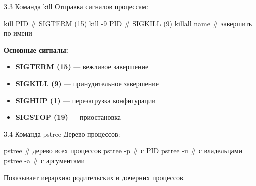 \documentclass[
  ignorenonframetext,
  aspectratio=169,
  russian,
]{beamer}
\newenvironment{Shaded}{\begin{snugshade}}{\end{snugshade}}
\newcommand{\AttributeTok}[1]{\textcolor[rgb]{0.40,0.45,0.13}{#1}}
\newcommand{\BuiltInTok}[1]{\textcolor[rgb]{0.00,0.23,0.31}{#1}}
\newcommand{\CommentTok}[1]{\textcolor[rgb]{0.37,0.37,0.37}{#1}}
\newcommand{\FunctionTok}[1]{\textcolor[rgb]{0.28,0.35,0.67}{#1}}
\newcommand{\NormalTok}[1]{\textcolor[rgb]{0.00,0.23,0.31}{#1}}
\providecommand{\tightlist}{%
  \setlength{\itemsep}{0pt}\setlength{\parskip}{0pt}}
\begin{document}
\begin{frame}[fragile]{3.3 Команда kill}
\label{ux43aux43eux43cux430ux43dux434ux430-kill}
Отправка сигналов процессам:

\begin{Shaded}
\begin{Highlighting}[]
\BuiltInTok{kill}\NormalTok{ PID        }\CommentTok{\# SIGTERM (15)}
\BuiltInTok{kill} \AttributeTok{{-}9}\NormalTok{ PID     }\CommentTok{\# SIGKILL (9)}
\FunctionTok{killall}\NormalTok{ name    }\CommentTok{\# завершить по имени}
\end{Highlighting}
\end{Shaded}

\textbf{Основные сигналы:}

\begin{itemize}[<+->]
\tightlist
\item
  \textbf{SIGTERM (15)} --- вежливое завершение
\item
  \textbf{SIGKILL (9)} --- принудительное завершение
\item
  \textbf{SIGHUP (1)} --- перезагрузка конфигурации
\item
  \textbf{SIGSTOP (19)} --- приостановка
\end{itemize}
\end{frame}

\begin{frame}[fragile]{3.4 Команда pstree}
\label{ux43aux43eux43cux430ux43dux434ux430-pstree}
Дерево процессов:

\begin{Shaded}
\begin{Highlighting}[]
\FunctionTok{pstree}       \CommentTok{\# дерево всех процессов}
\FunctionTok{pstree} \AttributeTok{{-}p}    \CommentTok{\# с PID}
\FunctionTok{pstree} \AttributeTok{{-}u}    \CommentTok{\# с владельцами}
\FunctionTok{pstree} \AttributeTok{{-}a}    \CommentTok{\# с аргументами}
\end{Highlighting}
\end{Shaded}

Показывает иерархию родительских и дочерних процессов.
\end{frame}
\end{document}
